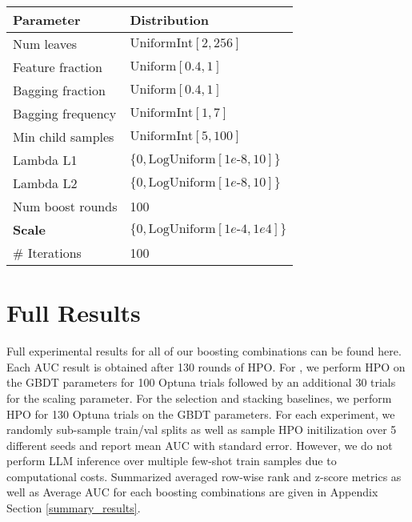 \begin{table}[H]
\begin{minipage}{.5\linewidth}
{\begin{tabular}{ll}
            Parameter & Distribution \\
            \midrule
            Num leaves & $\mathrm{UniformInt[2,256]}$\\
            Feature fraction & $\mathrm{Uniform}[0.4, 1]$ \\
            Bagging fraction & $\mathrm{Uniform}[0.4, 1]$ \\
            Bagging frequency & $\mathrm{UniformInt[1,7]}$\\
            Min child samples & $\mathrm{UniformInt[5,100]}$\\
            Lambda L1 & $\{0, \mathrm{LogUniform}[1e\text{-}8, 10]\}$ \\ 
            Lambda L2 & $\{0, \mathrm{LogUniform}[1e\text{-}8, 10]\}$ \\ 
            Num boost rounds & 100 \\
            \textbf{Scale} & $\{0, \mathrm{LogUniform}[1e\text{-}4, 1e4]\}$ \\
            \midrule
            \# Iterations & 100 \\
            \bottomrule
        \end{tabular}}
    \end{minipage} 
\end{table}


\section{Full Results}
\label{full_results}
Full experimental results for all of our boosting combinations can be found here. Each AUC result is obtained after 130 rounds of HPO. For \methodname, we perform HPO on the GBDT parameters for 100 Optuna \citep{optuna_2019} trials followed by an additional 30 trials for the scaling parameter. For the selection and stacking baselines, we perform HPO for 130 Optuna trials on the GBDT parameters. For each experiment, we randomly sub-sample train/val splits as well as sample HPO initilization over 5 different seeds and report mean AUC with standard error. However, we do not perform LLM inference over multiple few-shot train samples due to computational costs. Summarized averaged row-wise rank and z-score metrics as well as Average AUC for each boosting combinations are given in Appendix Section \ref{summary_results}.



